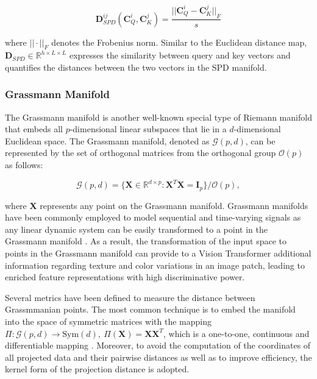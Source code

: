 \documentclass[10pt,twocolumn,letterpaper]{article}
\begin{document}
\begin{equation}
    \textbf{D}_{SPD}^{ij}(\textbf{C}_Q^i,\textbf{C}_K^j) =  \frac{{|| \textbf{C}_Q^i -\textbf{C}_K^j ||}_F}{s}
    \label{eq:spddm}
\end{equation}

where ${|| \cdot ||}_F$ denotes the Frobenius norm. Similar to the Euclidean distance map, $\textbf{D}_{SPD} \in \mathbb{R}^{h\times L \times L}$ expresses the similarity between query and key vectors and quantifies the distances between the two vectors in the SPD manifold.

\subsubsection{Grassmann Manifold}

The Grassmann manifold is another well-known special type of Riemann manifold that embeds all $p$-dimensional linear subspaces that lie in a $d$-dimensional Euclidean space. The Grassmann manifold, denoted as $ \mathcal{G}(p,d)$, can be represented by the set of orthogonal matrices from the orthogonal group $\mathcal{O}(p)$ as follows:

\begin{equation}
    \mathcal{G}(p,d) = \{ \textbf{X}\in \mathbb{R}^{d\times p} : \textbf{X}^T\textbf{X}=\textbf{I}_p \}/ \mathcal{O}(p),
\end{equation}

where \textbf{X} represents any point on the Grassmann manifold. Grassmann manifolds have been commonly employed to model sequential and time-varying signals as any linear dynamic system can be easily transformed to a point in the Grassmann manifold \cite{Author12,Author14}. As a result, the transformation of the input space to points in the Grassmann manifold can provide to a Vision Transformer additional information regarding texture and color variations in an image patch, leading to enriched feature representations with high discriminative power.

Several metrics have been defined to measure the distance between Grassmmanian points. The most common technique is to embed the manifold into the space of symmetric matrices with the mapping $\Pi : \mathcal{G}(p,d) \rightarrow \mathrm{Sym}(d), ~ \Pi(\textbf{X}) = \textbf{X}\textbf{X}^T$, which is a one-to-one, continuous and differentiable mapping \cite{Author31}. Moreover, to avoid the computation of the coordinates of all projected data and their pairwise distances as well as to improve efficiency, the kernel form of the projection distance \cite{Author15} is adopted.
\end{document}
